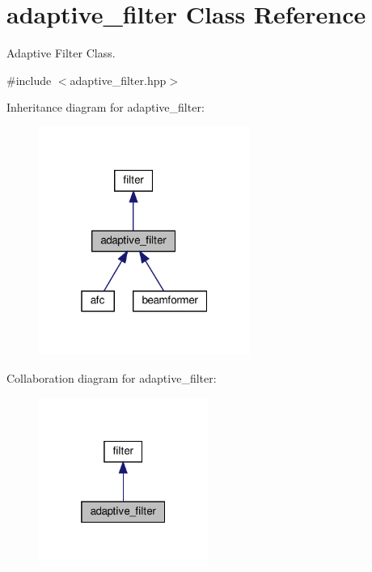 \hypertarget{classadaptive__filter}{}\section{adaptive\+\_\+filter Class Reference}
\label{classadaptive__filter}


Adaptive Filter Class.  




{\ttfamily \#include $<$adaptive\+\_\+filter.\+hpp$>$}



Inheritance diagram for adaptive\+\_\+filter\+:\nopagebreak
\begin{figure}[H]
\begin{center}
\leavevmode
\includegraphics[width=196pt]{classadaptive__filter__inherit__graph}
\end{center}
\end{figure}


Collaboration diagram for adaptive\+\_\+filter\+:\nopagebreak
\begin{figure}[H]
\begin{center}
\leavevmode
\includegraphics[width=157pt]{classadaptive__filter__coll__graph}
\end{center}
\end{figure}
